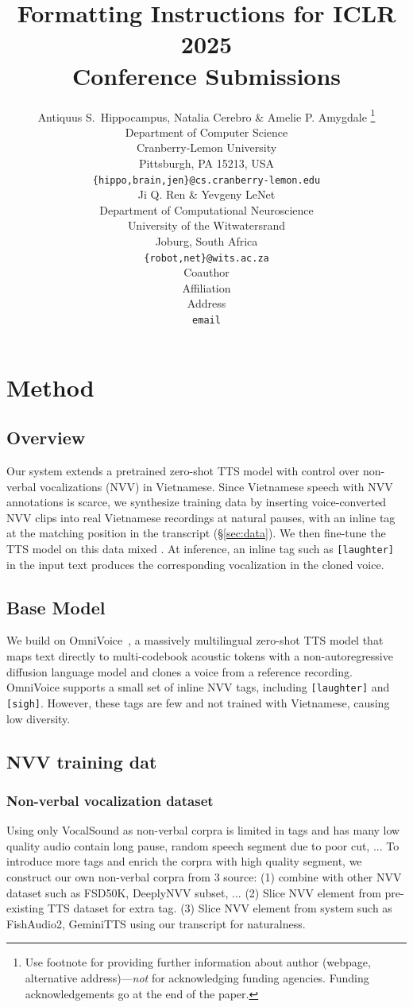 \documentclass{article} %
\title{Formatting Instructions for ICLR 2025 \\ Conference Submissions}
\author{Antiquus S.~Hippocampus, Natalia Cerebro \& Amelie P. Amygdale \thanks{ Use footnote for providing further information
about author (webpage, alternative address)---\emph{not} for acknowledging
funding agencies.  Funding acknowledgements go at the end of the paper.} \\
Department of Computer Science\\
Cranberry-Lemon University\\
Pittsburgh, PA 15213, USA \\
\texttt{\{hippo,brain,jen\}@cs.cranberry-lemon.edu} \\
\And
Ji Q. Ren \& Yevgeny LeNet \\
Department of Computational Neuroscience \\
University of the Witwatersrand \\
Joburg, South Africa \\
\texttt{\{robot,net\}@wits.ac.za} \\
\AND
Coauthor \\
Affiliation \\
Address \\
\texttt{email}
}
\begin{document}
\maketitle

\begin{abstract}
\end{abstract}

\section{Method}
\subsection{Overview}
Our system extends a pretrained zero-shot TTS model with control over non-verbal
vocalizations (NVV) in Vietnamese. Since Vietnamese speech with NVV annotations is scarce, we synthesize training data by inserting voice-converted NVV clips into real Vietnamese recordings at natural pauses, with an inline tag at the matching position in the transcript (\S\ref{sec:data}). We then fine-tune the TTS model on this data mixed . At inference, an inline tag such as \texttt{[laughter]} in the input text produces the corresponding vocalization in the cloned voice.
\subsection{Base Model}

We build on OmniVoice~\cite{omnivoice}, a massively multilingual zero-shot TTS model that maps text directly to multi-codebook acoustic tokens with a non-autoregressive diffusion language model and clones a voice from a reference recording. OmniVoice supports a small set of inline NVV tags, including \texttt{[laughter]} and \texttt{[sigh]}. However, these tags are few and not trained with Vietnamese, causing low diversity.

\subsection{NVV training dat}
\subsubsection{Non-verbal vocalization dataset}
Using only VocalSound as non-verbal corpra is limited in tags and has many low quality audio contain long pause, random speech segment due to poor cut, ... To introduce more tags and enrich the corpra with high quality segment, we construct our own non-verbal corpra from 3 source: (1) combine with other NVV dataset such as FSD50K, DeeplyNVV subset, ... (2) Slice NVV element from pre-existing TTS dataset for extra tag. (3) Slice NVV element from system such as FishAudio2, GeminiTTS using our transcript for naturalness. 
\end{document}
